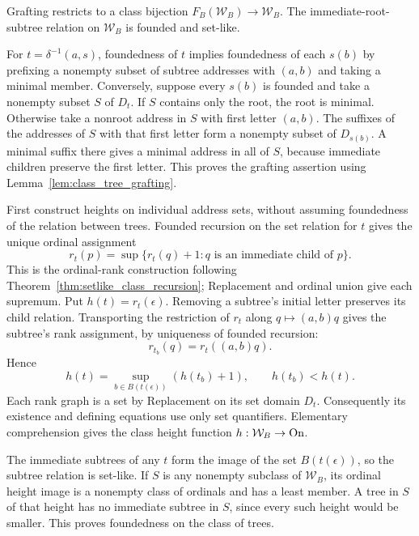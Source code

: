 \begin{lemma}
\label{lem:class_W_founded}
Grafting restricts to a class bijection
$F_B(\mathcal W_B)\to\mathcal W_B$. The immediate-root-subtree
relation on $\mathcal W_B$ is founded and set-like.
\end{lemma}
\Proof
For $t=\delta^{-1}(a,s)$, foundedness of $t$ implies foundedness of
each $s(b)$ by prefixing a nonempty subset of subtree addresses with
$(a,b)$ and taking a minimal member. Conversely, suppose every $s(b)$
is founded and take a nonempty subset $S$ of $D_t$. If $S$ contains
only the root, the root is minimal. Otherwise take a nonroot address
in $S$ with first letter $(a,b)$. The suffixes of the addresses of $S$
with that first letter form a nonempty subset of $D_{s(b)}$. A minimal
suffix there gives a minimal address in all of $S$, because immediate
children preserve the first letter. This proves the grafting assertion
using Lemma~\ref{lem:class_tree_grafting}.

First construct heights on individual address sets, without assuming
foundedness of the relation between trees. Founded recursion on the set
relation for $t$ gives the unique ordinal assignment
\[
r_t(p)=\sup\{r_t(q)+1:q\text{ is an immediate child of }p\}.
\]
This is the ordinal-rank construction following
Theorem~\ref{thm:setlike_class_recursion}; Replacement and ordinal union
give each supremum. Put $h(t)=r_t(\epsilon)$. Removing a subtree's
initial letter preserves its child relation. Transporting the restriction
of $r_t$ along $q\mapsto(a,b)q$ gives the subtree's rank assignment,
by uniqueness of founded recursion:
\[
r_{t_b}(q)=r_t((a,b)q).
\]
Hence
\[
h(t)=\sup_{b\in B(t(\epsilon))}(h(t_b)+1),\qquad h(t_b)<h(t).
\]
Each rank graph is a set by Replacement on its set domain $D_t$.
Consequently its existence and defining equations use only set
quantifiers. Elementary comprehension gives the class height
function $h:\mathcal W_B\to\mathrm{On}$.

The immediate subtrees of any $t$ form the image of the set
$B(t(\epsilon))$, so the subtree relation is set-like. If $S$ is any
nonempty subclass of $\mathcal W_B$, its ordinal height image is a
nonempty class of ordinals and has a least member. A tree in $S$ of
that height has no immediate subtree in $S$, since every such height
would be smaller. This proves foundedness on the class of trees.
\Done

